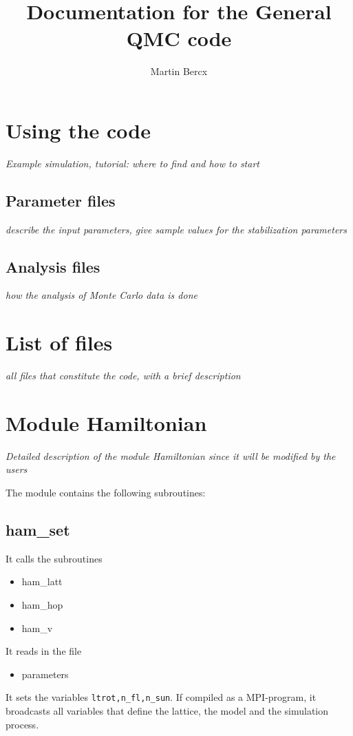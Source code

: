 \documentclass[10pt,Arial]{article}
\begin{document}
\title{Documentation for the General QMC code}
\author{Martin Bercx}
\maketitle

\section{Using the code}
\textit{Example simulation, tutorial: where to find and how to start}\\

\subsection{Parameter files}
\textit{describe the input parameters, give sample values for the stabilization parameters}
\subsection{Analysis files}
\textit{how the analysis of Monte Carlo data is done}
\section{List of files}
\textit{all files that constitute the code, with a brief description}


\section{Module Hamiltonian}
\textit{Detailed description of the module Hamiltonian since it will be modified by the users}

The module contains the following subroutines:
\subsection{ham\_set}
It calls the subroutines
\begin{itemize}
\item ham\_latt
\item ham\_hop
\item ham\_v
\end{itemize}
It reads in the file
\begin{itemize}
\item parameters
\end{itemize}
It sets the variables {\tt ltrot,n\_fl,n\_sun}.
If compiled as a MPI-program, it broadcasts all variables that define the lattice, the model and the simulation process.
\end{document}
